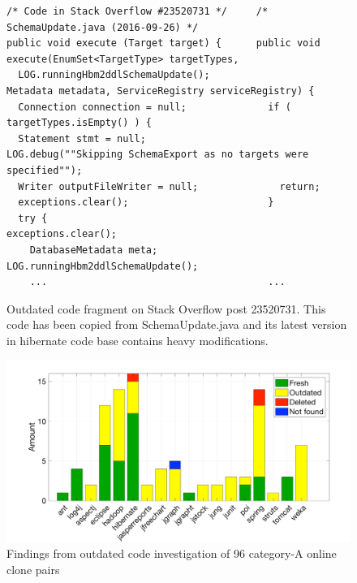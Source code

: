 \documentclass{sig-alternate-05-2015}
\begin{document}
\begin{figure}
	\begin{lstlisting}
/* Code in Stack Overflow #23520731 */     /* SchemaUpdate.java (2016-09-26) */
public void execute (Target target) {      public void execute(EnumSet<TargetType> targetTypes, 
  LOG.runningHbm2ddlSchemaUpdate();                        Metadata metadata, ServiceRegistry serviceRegistry) {
  Connection connection = null;              if ( targetTypes.isEmpty() ) {
  Statement stmt = null;                       LOG.debug(""Skipping SchemaExport as no targets were specified"");
  Writer outputFileWriter = null;              return;
  exceptions.clear();                        }
  try {                                      exceptions.clear();
    DatabaseMetadata meta;                   LOG.runningHbm2ddlSchemaUpdate();
    ...                                      ...
	\end{lstlisting}
	\caption{Outdated code fragment on Stack Overflow post 23520731. This code has been copied from SchemaUpdate.java and its latest version in hibernate code base contains heavy modifications.}
	\label{fig:hibernate_outdated_code}
\end{figure}

\begin{figure}
	\centering
	\includegraphics[width=\linewidth]{outdated}
	\caption{Findings from outdated code investigation of 96 category-A online clone pairs}
	\label{fig:outdated}
\end{figure}
\end{document}
